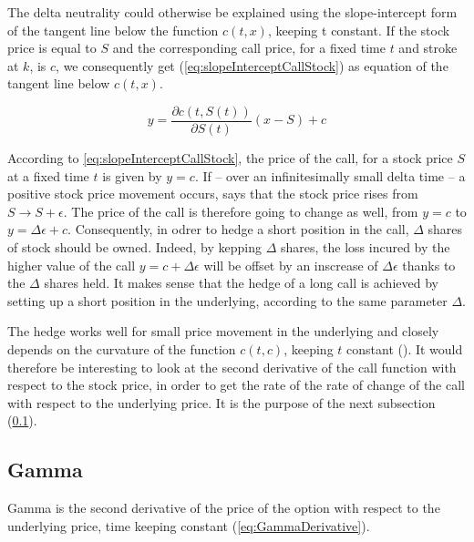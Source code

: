 \documentclass[12pt]{report}
\newcommand{\call}[2]{c\left( #1, #2\right)}
\newcommand{\St}{S\left(t\right)}
\begin{document}
The delta neutrality could otherwise be explained using the slope-intercept form of the tangent line below the function $\call{t}{x}$, keeping t constant. If the stock price is equal to $S$ and the corresponding call price, for a fixed time $t$ and stroke at $k$, is $c$, we consequently get (\ref{eq:slopeInterceptCallStock}) as equation of the tangent line below $\call{t}{x}$.
\begin{center}
  \begin{equation}
       y  =  \frac{\partial \call{t}{\St}}{\partial \St}  ( x - S) + c
       \label{eq:slopeInterceptCallStock}
  \end{equation}
\end{center}
According to \ref{eq:slopeInterceptCallStock}, the price of the call, for a stock price $S$ at a fixed time $t$ is given by $y = c$.
If -- over an infinitesimally small delta time -- a positive stock price movement occurs, says that the stock price rises from $S \to S + \epsilon$. The price of the call is therefore going to change as well, from $y = c$ to $y = \Delta \epsilon + c$.
Consequently, in odrer to hedge a short position in the call, $\Delta$ shares of stock should be owned. Indeed, by kepping $\Delta$ shares, the loss incured by the higher value of the call $y = c + \Delta \epsilon$ will be offset by an inscrease of $\Delta \epsilon$ thanks to the $\Delta$ shares held.
It makes sense that the hedge of a long call is achieved by setting up a short position in the underlying, according to the same parameter $\Delta$.

The hedge works well for small price movement in the underlying and closely depends on the curvature of the function $\call{t}{c}$, keeping $t$ constant (\citet{shreve}).
It would therefore be interesting to look at the second derivative of the call function with respect to the stock price, in order to get the rate of the rate of change of the call with respect to the underlying price.
It is the purpose of the next subsection (\ref{sub:Gamma}).


\subsection{Gamma}
\label{sub:Gamma}

Gamma is the second derivative of the price of the option with respect to the underlying price, time keeping constant (\ref{eq:GammaDerivative}). 
\end{document}
